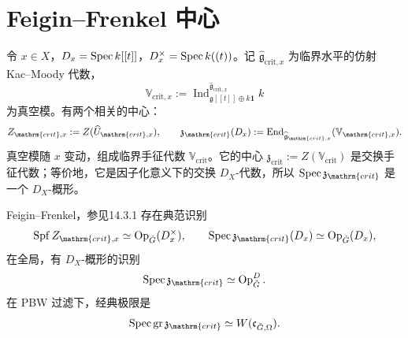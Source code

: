 \section{Feigin–Frenkel 中心}\label{sec:14.3}
令 $x\in X$，$D_x=\operatorname{Spec} k[[t]]$，$D_x^\times=\operatorname{Spec} k((t))$。记 $\widehat{\mathfrak g}_{\mathrm{crit},x}$ 为临界水平的仿射 Kac–Moody 代数，
\[\mathbb V_{\mathrm{crit},x}:=\operatorname{Ind}_{\mathfrak g[[t]]\oplus k\mathbf1}^{\widehat{\mathfrak g}_{\mathrm{crit},x}}k\]
为真空模。有两个相关的中心：
\[Z_{\mathrm{crit},x}:=Z(\widehat U_{\mathrm{crit},x}),\qquad
\mathfrak z_{\mathrm{crit}}(D_x):=\End_{\widehat{\mathfrak g}_{\mathrm{crit},x}}(\mathbb V_{\mathrm{crit},x}).\]
真空模随 $x$ 变动，组成临界手征代数 $\mathbb V_{\mathrm{crit}}$。它的中心 $\mathfrak z_{\mathrm{crit}}:=Z(\mathbb V_{\mathrm{crit}})$ 是交换手征代数；等价地，它是因子化意义下的交换 $D_X$-代数，所以 $\Spec\mathfrak z_{\mathrm{crit}}$ 是一个 $D_X$-概形。
\begin{theorem}{Feigin–Frenkel，参见\cite{Fre02}}{14.3.1}
存在典范识别
\[\operatorname{Spf}Z_{\mathrm{crit},x}\simeq\Op_{\checkG}(D_x^\times),\qquad
\Spec\mathfrak z_{\mathrm{crit}}(D_x)\simeq\Op_{\checkG}(D_x),\]
在全局，有 $D_X$-概形的识别
\[\Spec\mathfrak z_{\mathrm{crit}}\simeq\Op^D_{\checkG}.\]
在 PBW 过滤下，经典极限是
\[\Spec\operatorname{gr}\mathfrak z_{\mathrm{crit}}\simeq W(\mathfrak c_{\checkG,\Omega}).\]
\end{theorem}
